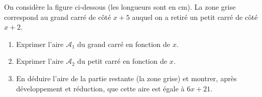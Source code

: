 \documentclass[a4paper]{book}
\begin{document}
    
    \begin{exercice}
    On considère la figure ci-dessous (les longueurs sont en cm). La zone grise correspond au grand carré de côté $x+5$ auquel on a retiré un petit carré de côté $x+2$.
    
    \begin{center}
    \end{center}
    
    \begin{enumerate}
        \item Exprimer l'aire $\mathcal{A}_1$ du grand carré en fonction de $x$.
        \item Exprimer l'aire $\mathcal{A}_2$ du petit carré en fonction de $x$.
        \item En déduire l'aire de la partie restante (la zone grise) et montrer, après développement et réduction, que cette aire est égale à $6x + 21$.
    \end{enumerate}
    \end{exercice}
\end{document}
